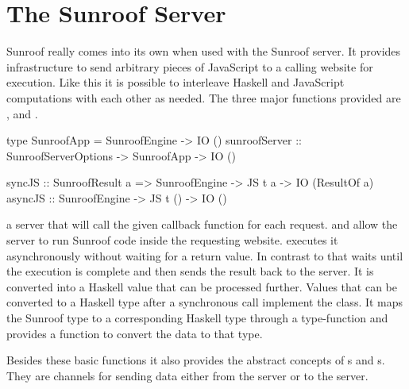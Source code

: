  
\section{The Sunroof Server}
\label{sec:server}

Sunroof really comes into its own when used with the Sunroof server.
It provides infrastructure to send arbitrary pieces 
of JavaScript to a calling website for execution. 
Like this it is possible to interleave Haskell and JavaScript 
computations with each other as needed. The three major functions
provided are ,  and .
\begin{Code}
type SunroofApp = SunroofEngine -> IO ()
sunroofServer :: SunroofServerOptions -> SunroofApp -> IO ()

syncJS  :: SunroofResult a 
        => SunroofEngine -> JS t a -> IO (ResultOf a)
asyncJS :: SunroofEngine -> JS t () -> IO ()
\end{Code}
 a server that will call the given callback function
for each request.
 and  allow the server
to run Sunroof code inside the requesting website.
 executes it asynchronously without 
waiting for a return value. In contrast to that 
 waits until the execution is complete and
then sends the result back to the server. It
is converted into a Haskell value that can be processed further. 
Values that can be converted to a Haskell type after a synchronous
call implement the  class. It maps the 
Sunroof type to a corresponding Haskell type through a type-function 
and provides a function to convert the data to that type.

Besides these basic functions it also provides the abstract 
concepts of s and s. They are 
channels for sending data either from the server or to
the server.

